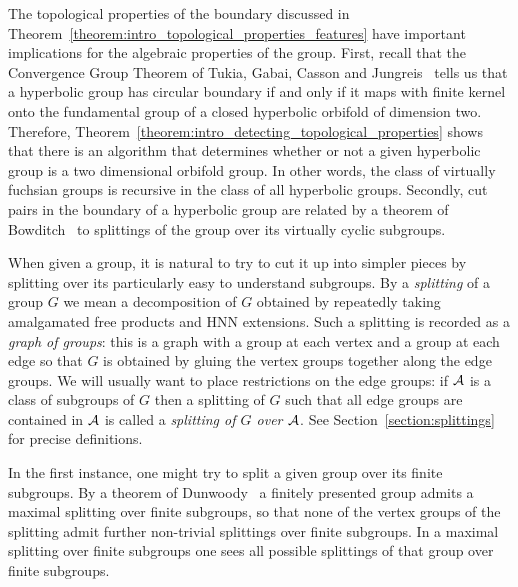 The topological properties of the boundary discussed in Theorem~\ref{theorem:intro_topological_properties_features} have important implications for the algebraic properties of the group.
First, recall that the Convergence Group Theorem of Tukia, Gabai, Casson and Jungreis~\cite{tukia88,gabai92,cassonjungreis94} tells us that a hyperbolic group has circular boundary if and only if it maps with finite kernel onto the fundamental group of a closed hyperbolic orbifold of dimension two.
Therefore, Theorem~\ref{theorem:intro_detecting_topological_properties} shows that there is an algorithm that determines whether or not a given hyperbolic group is a two dimensional orbifold group.
In other words, the class of virtually fuchsian groups is recursive in the class of all hyperbolic groups.
Secondly, cut pairs in the boundary of a hyperbolic group are related by a theorem of Bowditch~\cite{bowditch98} to splittings of the group over its virtually cyclic subgroups.

When given a group, it is natural to try to cut it up into simpler pieces by splitting over its particularly easy to understand subgroups.
By a \emph{splitting} of a group $G$ we mean a decomposition of $G$ obtained by repeatedly taking amalgamated free products and HNN extensions.
Such a splitting is recorded as a \emph{graph of groups}: this is a graph with a group at each vertex and a group at each edge so that $G$ is obtained by gluing the vertex groups together along the edge groups.
We will usually want to place restrictions on the edge groups: if $\mathcal{A}$ is a class of subgroups of $G$ then a splitting of $G$ such that all edge groups are contained in $\mathcal{A}$ is called a \emph{splitting of $G$ over $\mathcal{A}$}.
See Section~\ref{section:splittings} for precise definitions.

In the first instance, one might try to split a given group over its finite subgroups.
By a theorem of Dunwoody~\cite{dunwoody85} a finitely presented group admits a maximal splitting over finite subgroups, so that none of the vertex groups of the splitting admit further non-trivial splittings over finite subgroups. 
In a maximal splitting over finite subgroups one sees all possible splittings of that group over finite subgroups.

